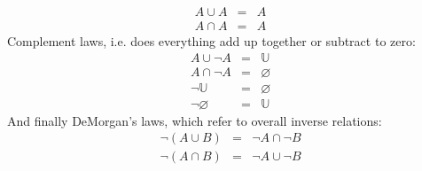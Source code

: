\documentclass[letterpaper,10pt,english]{jupyterBook}
\begin{document}
\begin{equation*}
\begin{split}A \cup A &=& A \\
A \cap A &=& A\end{split}
\end{equation*}
\sphinxAtStartPar
Complement laws, i.e. does everything add up together or subtract to zero:
\begin{equation*}
\begin{split}A \cup \neg A &=& \mathbb{U} \\
A \cap \neg A &=& \varnothing \\
\neg \mathbb{U} &=& \varnothing \\
\neg \varnothing &=& \mathbb{U}\end{split}
\end{equation*}
\sphinxAtStartPar
And finally DeMorgan’s laws, which refer to overall inverse relations:
\begin{equation*}
\begin{split}\neg(A \cup B) &=& \neg A \cap \neg B \\
\neg(A \cap B) &=& \neg A \cup \neg B\end{split}
\end{equation*}
\end{document}
